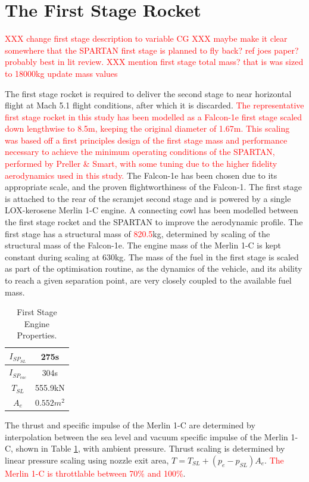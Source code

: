 \section{The First Stage Rocket}\label{sec:firststage}
\textcolor{red}{XXX change first stage description to variable CG}
\textcolor{red}{XXX maybe make it clear somewhere that the SPARTAN first stage is planned to fly back? ref joes paper? probably best in lit review.}
\textcolor{red}{XXX mention first stage total mass? that is was sized to 18000kg update mass values}

The first stage rocket is required to deliver the second stage to near horizontal flight at Mach 5.1 flight conditions,
after which it is discarded. 
\textcolor{red}{The representative first stage rocket in this study has been  modelled as a Falcon-1e first stage scaled down
lengthwise to 8.5m, keeping the original diameter of 1.67m\cite{Vehicle2008}. This scaling was based off a first principles design of the first stage mass and performance necessary to achieve the minimum operating conditions of the SPARTAN, performed by Preller \& Smart\cite{Preller2017b}, with some tuning due to the higher fidelity aerodynamics used in this study.}
The Falcon-1e has been chosen due to its appropriate scale, and the proven flightworthiness of the Falcon-1. 
 The first stage is attached to the rear of the scramjet
second stage and is powered by a single LOX-kerosene Merlin 1-C engine. A connecting cowl has been modelled between the first stage rocket and the SPARTAN to improve the aerodynamic profile.  The first stage has a structural mass of
\textcolor{red}{820.5}kg, determined by scaling of the structural mass of the Falcon-1e. The engine mass of the Merlin 1-C is kept constant during scaling at 630kg\cite{Wade2017}. The mass of the
fuel in the first stage is scaled as part of the optimisation routine, as the dynamics of the vehicle, and its ability to reach a
given separation point, are very closely coupled to the available fuel mass.

\begin{table}[!h]
	\centering
	\begin{tabular}{|c|c|}
		\hline  $I_{SP_{SL}}$ & 275s \\ 
		\hline  $I_{SP_{vac}}$ & 304s\\ 
		\hline  $T_{SL}$ & 555.9kN \\ 
		\hline  $A_{e}$ & $0.552m^2$ \\ 
		\hline 
	\end{tabular} 
	\caption{First Stage Engine Properties\cite{Wade2017}.}
	\label{tab:1stStageEngine}
\end{table}
The thrust and specific impulse of the Merlin 1-C are determined by interpolation between the sea level and vacuum specific impulse of the Merlin 1-C, shown in Table \ref{tab:1stStageEngine}, with ambient pressure. Thrust scaling is determined by linear pressure scaling using nozzle exit area, $T = T_{SL} + (p_e - p_{SL})A_e$. 
 \textcolor{red}{The Merlin 1-C is throttlable between 70\% and 100\%\cite{Norris2011}}.




